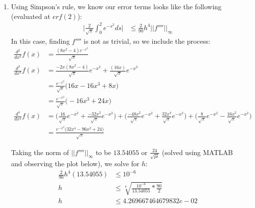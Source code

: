 \documentclass[11pt,a4paper]{article}
\begin{document}
\begin{itemize}
\begin{enumerate} [label={\alph*)}]
\begin{lstlisting}
trueError = 0.995322265;

IT = f(x);
IT(1) = .5*IT(1);
IT(n+1) = .5*IT(n+1);
IT = IT*h;

error = abs(trueError - sum(IT));

end

function y=f(x)
    y = 2/sqrt(pi).*exp(-x.*x);
end
						\end{lstlisting}
						
						Using the above code we are able to find an error of $9.807542619477694e-06$ with as little as $n=53$ sub intervals. This perhaps highlights that $h$ is our worst case scenario, when in practice, rarely are we dealing with worst case.
						
					\item Using Simpson's rule, we know our error terms looks like the following (evaluated at $erf(2)$):
					\begin{align*}
					\Biggl \vert \frac{2}{\sqrt{\pi}} \int_{0}^{2}e^{-s^2}ds \Biggl\vert &\leq \frac{2}{90}h^4 \vert \vert f'''' \vert \vert_\infty
					\end{align*}
					In this case, finding $f''''$ is not as trivial, so we include the process:
					\begin{align*}
						\frac{d^2}{dx^2}f(x) &= \frac{(8x^2-4)e^{-x^2}}{\sqrt{\pi}} \\
						\frac{d^3}{dx^3}f(x) &= \frac{-2x(8x^2-4)}{\sqrt{\pi}}e^{-x^2} + \frac{(16x)}{\sqrt{\pi}}e^{-x^2} \\
						 &= \frac{e^{-x^2}}{\sqrt{\pi}}\big(16x-16x^3+8x) \\
						 &= \frac{e^{-x^2}}{\sqrt{\pi}}\big(-16x^3+24x) \\
						\frac{d^4}{dx^4}f(x) &= \Big(\frac{16}{\sqrt{\pi}}e^{-x^2} + \frac{-32x^2}{\sqrt{\pi}}e^{-x^2} \Big) + \Big(\frac{-48x^2}{\sqrt{\pi}}e^{-x^2} + \frac{32x^4}{\sqrt{\pi}}e^{-x^2} \Big) + \Big(\frac{8}{\sqrt{\pi}}e^{-x^2} - \frac{16x^2}{\sqrt{\pi}}e^{-x^2} \Big) \\
						&= \frac{e^{-x^2}\big(32x^4 - 96x^2 + 24 \big)}{\sqrt{\pi}}
					\end{align*}
					
					Taking the norm of $\vert \vert f'''' \vert \vert_\infty$ to be $13.54055$ or $\frac{24}{\sqrt{pi}}$ (solved using MATLAB and observing the plot below), we solve for $h$:
					\begin{align*}
					\frac{2}{90}h^4 (13.54055) &\leq 10^{-6} \\
					h &\leq \sqrt[4]{\frac{10^{-6}}{13.54055}*\frac{90}{2}} \\
					h &\leq 4.269667464679832e-02
					\end{align*}
					

\end{enumerate}
\end{itemize}
\end{document}
